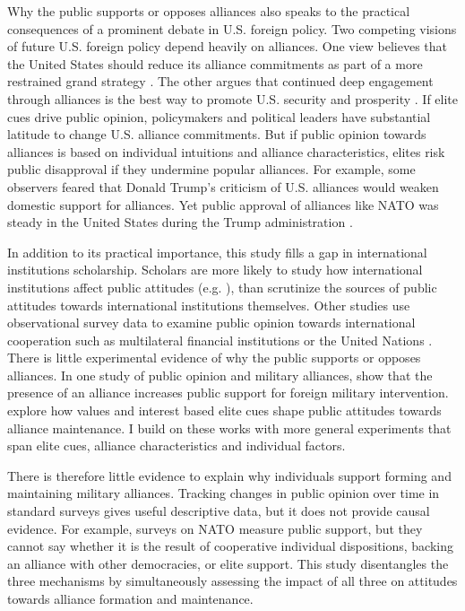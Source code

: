 \documentclass[12pt]{article}
\begin{document}
Why the public supports or opposes alliances also speaks to the practical consequences of a prominent debate in U.S. foreign policy. 
Two competing visions of future U.S. foreign policy depend heavily on alliances. 
One view believes that the United States should reduce its alliance commitments as part of a more restrained grand strategy \citep{Preble2009, Posen2014}.
The other argues that continued deep engagement through alliances is the best way to promote U.S. security and prosperity \citep{Brooksetal2013, BrandsFeaver2017}. 
If elite cues drive public opinion, policymakers and political leaders have substantial latitude to change U.S. alliance commitments. 
But if public opinion towards alliances is based on individual intuitions and alliance characteristics, elites risk public disapproval if they undermine popular alliances.  
For example, some observers feared that Donald Trump's criticism of U.S. alliances would weaken domestic support for alliances.
Yet public approval of alliances like NATO was steady in the United States during the Trump administration \citep{PewNATO2020}. 


In addition to its practical importance, this study fills a gap in international institutions scholarship. 
Scholars are more likely to study how international institutions affect public attitudes (e.g. \citep{KayaWalker2014, Greenhill2020}), than scrutinize the sources of public attitudes towards international institutions themselves. 
Other studies use observational survey data to examine public opinion towards international cooperation such as multilateral financial institutions \citep{Edwards2009} or the United Nations \citep{Torgler2008, DellmuthTallberg2015}. 
There is little experimental evidence of why the public supports or opposes alliances.
In one study of public opinion and military alliances, \citet{TomzWeeks2021} show that the presence of an alliance increases public support for foreign military intervention. 
\citet{Chuetal2021} explore how values and interest based elite cues shape public attitudes towards alliance maintenance. 
I build on these works with more general experiments that span elite cues, alliance characteristics and individual factors. 


There is therefore little evidence to explain why individuals support forming and maintaining military alliances. 
Tracking changes in public opinion over time in standard surveys gives useful descriptive data, but it  does not provide causal evidence.
For example, surveys on NATO measure public support, but they cannot say whether it is the result of cooperative individual dispositions, backing an alliance with other democracies, or elite support. 
This study disentangles the three mechanisms by simultaneously assessing the impact of all three on attitudes towards alliance formation and maintenance. 
\end{document}
